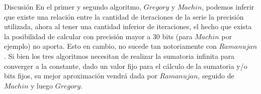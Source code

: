 \begin{section}{Discusión}
	En el primer y segundo algoritmo, $Gregory$ y $Machin$, podemos inferir que existe una relación entre la cantidad de iteraciones de la serie la precisión utilizada, ahora al tener una cantidad inferior de iteraciones, el hecho que exista la posibilidad de calcular con precisión mayor a 30 bits (para $Machin$ por ejemplo) no aporta. Esto en cambio, no sucede tan notoriamente con $Ramanujan$. Si bien los tres algoritmos necesitan de realizar la sumatoria infinita para converger a la constante, dado un valor fijo para el cálculo de la sumatoria y/o bits fijos, su mejor aproximación vendrá dada por $Ramanujan$, seguido de $Machin$ y luego $Gregory$.
	\\

\end{section}

